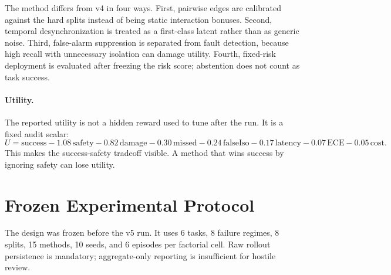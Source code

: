 \documentclass{article}
\begin{document}
The method differs from v4 in four ways. First, pairwise edges are calibrated against the hard splits instead of being static interaction bonuses. Second, temporal desynchronization is treated as a first-class latent rather than as generic noise. Third, false-alarm suppression is separated from fault detection, because high recall with unnecessary isolation can damage utility. Fourth, fixed-risk deployment is evaluated after freezing the risk score; abstention does not count as task success.

\paragraph{Utility.}
The reported utility is not a hidden reward used to tune after the run. It is a fixed audit scalar:
\[
U = \mathrm{success} - 1.08\,\mathrm{safety} - 0.82\,\mathrm{damage} - 0.30\,\mathrm{missed} - 0.24\,\mathrm{falseIso} - 0.17\,\mathrm{latency} - 0.07\,\mathrm{ECE} - 0.05\,\mathrm{cost}.
\]
This makes the success-safety tradeoff visible. A method that wins success by ignoring safety can lose utility.

\section{Frozen Experimental Protocol}
The design was frozen before the v5 run. It uses 6 tasks, 8 failure regimes, 8 splits, 15 methods, 10 seeds, and 6 episodes per factorial cell. Raw rollout persistence is mandatory; aggregate-only reporting is insufficient for hostile review.
\end{document}
